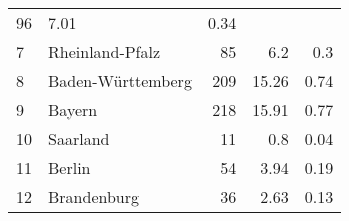 \begin{longtable}{lXrrr}
       \num{96} &
       \num[round-mode=places,round-precision=2]{7,01} &
         \num[round-mode=places,round-precision=2]{0,34} \\

     7 &
     \multicolumn{1}{X}{ Rheinland-Pfalz   } &


       \num{85} &
       \num[round-mode=places,round-precision=2]{6,2} &
         \num[round-mode=places,round-precision=2]{0,3} \\

     8 &
     \multicolumn{1}{X}{ Baden-Württemberg   } &


       \num{209} &
       \num[round-mode=places,round-precision=2]{15,26} &
         \num[round-mode=places,round-precision=2]{0,74} \\

     9 &
     \multicolumn{1}{X}{ Bayern   } &


       \num{218} &
       \num[round-mode=places,round-precision=2]{15,91} &
         \num[round-mode=places,round-precision=2]{0,77} \\

     10 &
     \multicolumn{1}{X}{ Saarland   } &


       \num{11} &
       \num[round-mode=places,round-precision=2]{0,8} &
         \num[round-mode=places,round-precision=2]{0,04} \\

     11 &
     \multicolumn{1}{X}{ Berlin   } &


       \num{54} &
       \num[round-mode=places,round-precision=2]{3,94} &
         \num[round-mode=places,round-precision=2]{0,19} \\

     12 &
     \multicolumn{1}{X}{ Brandenburg   } &


       \num{36} &
       \num[round-mode=places,round-precision=2]{2,63} &
         \num[round-mode=places,round-precision=2]{0,13} \\


\end{longtable}
